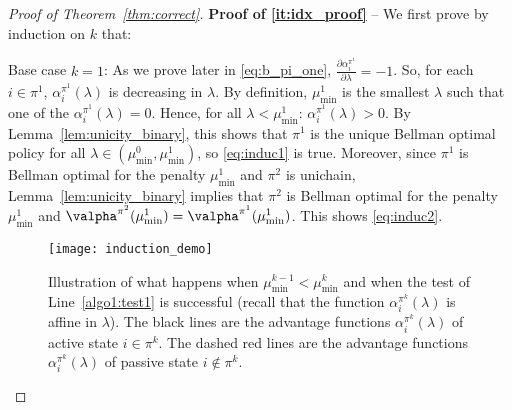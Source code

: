 \begin{proof}[Proof of Theorem~\ref{thm:correct}]
    \textbf{Proof of \ref{it:idx_proof}} -- We first prove by induction on $k$ that:\\

    Base case $k=1$: As we prove later in \eqref{eq:b_pi_one}, $\frac{\partial \alpha^{\pi^1}_i}{\partial \lambda} =-1$. So, for each $i\in\pi^1$, $\alpha^{\pi^1}_i(\lambda)$ is decreasing in $\lambda$. By definition, $\mu^1_{\min}$ is the smallest $\lambda$ such that one of the $\alpha^{\pi^{1}}_i(\lambda) = 0$. Hence, for all $\lambda<\mu^1_{\min}$: $\alpha^{\pi^{1}}_i(\lambda)>0$. By Lemma~\ref{lem:unicity_binary}, this shows that $\pi^1$ is the unique Bellman optimal policy for all $\lambda\in (\mu^0_{\min}, \mu^1_{\min})$, so \ref{eq:induc1} is true. Moreover, since $\pi^1$ is Bellman optimal for the penalty $\mu^1_{\min}$ and $\pi^2$ is unichain, Lemma~\ref{lem:unicity_binary} implies that $\pi^{2}$ is Bellman optimal for the penalty $\mu^{1}_{\min}$ and $\valpha^{\pi^2}(\mu^1_{\min}) =\valpha^{\pi^1}(\mu^1_{\min})$.
    This shows \ref{eq:induc2}.
    
    \begin{figure}[ht]
        \centering
            \texttt{[image: induction\_demo]}
        \caption{Illustration of what happens when $\mu^{k-1}_{\min}<\mu^k_{\min}$ and when the test of Line~\ref{algo1:test1} is successful (recall that the function $\alpha^{\pi^{k}}_i(\lambda)$ is affine in $\lambda$). The black lines are the advantage functions $\alpha^{\pi^k}_i(\lambda)$ of active state $i\in\pi^k$. The dashed red lines are the advantage functions $\alpha^{\pi^k}_i(\lambda)$ of passive state $i\not\in\pi^k$.}
        \label{fig:proof_algo}
    \end{figure}


\end{proof}
